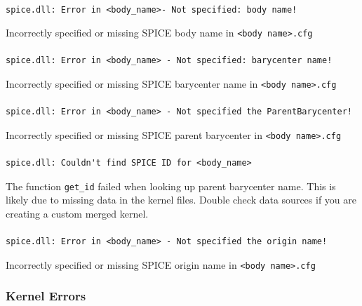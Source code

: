\documentclass[Orbiter Technical Reference.tex]{subfiles}
\begin{document}
\paragraph{}
\begin{verbatim}
spice.dll: Error in <body_name>- Not specified: body name!
\end{verbatim}
Incorrectly specified or missing SPICE body name in \texttt{<body name>.cfg}

\paragraph{}
\begin{verbatim}
spice.dll: Error in <body_name> - Not specified: barycenter name!
\end{verbatim}
Incorrectly specified or missing SPICE barycenter name in \texttt{<body name>.cfg}

\paragraph{}
\begin{verbatim}
spice.dll: Error in <body_name> - Not specified the ParentBarycenter!
\end{verbatim}
Incorrectly specified or missing SPICE parent barycenter in \texttt{<body name>.cfg}

\paragraph{}
\begin{verbatim}
spice.dll: Couldn't find SPICE ID for <body_name>
\end{verbatim}
The function \texttt{get\_id} failed when looking up parent barycenter name. This is likely due to missing data in the kernel files. Double check data sources if you are creating a custom merged kernel.

\paragraph{}
\begin{verbatim}
spice.dll: Error in <body_name> - Not specified the origin name!
\end{verbatim}
Incorrectly specified or missing SPICE origin name in \texttt{<body name>.cfg}


\subsubsection{Kernel Errors}
\end{document}
